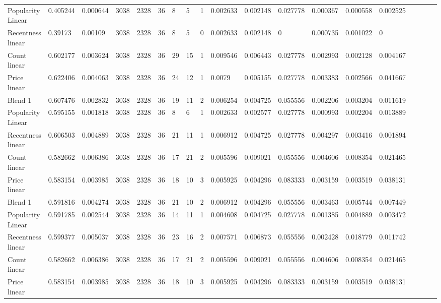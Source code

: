 \begin{table}[H]
{\begin{tabular}{*{19}l}
Popularity Linear	&	0.405244 &	0.000644 &	3038 &	2328 &	36 &	8  &	5 &		1 &	0.002633 &	0.002148 &	0.027778 &	0.000367 &	0.000558 &	0.002525 &	 \\
Recentness linear	&	0.39173  &	0.00109 &	3038 &	2328 &	36 &	8  &	5 &		0 &	0.002633 &	0.002148 &	0 		 &	0.000735 &	0.001022 &	0 &	 \\
Count linear		&	0.602177 &	0.003624 &	3038 &	2328 &	36 &	29 &	15 &	1 &	0.009546 &	0.006443 &	0.027778 &	0.002993 &	0.002128 &	0.004167 &	 \\
Price linear		&	0.622406 &	0.004063 &	3038 &	2328 &	36 &	24 &	12 &	1 &	0.0079   &	0.005155 &	0.027778 &	0.003383 &	0.002566 &	0.041667 &	 \\
Blend 1				&	0.607476 &	0.002832 &	3038 &	2328 &	36 &	19 &	11 &	2 &	0.006254 &	0.004725 &	0.055556 &	0.002206 &	0.003204 &	0.011619 &	 \\
Popularity Linear	&	0.595155 &	0.001818 &	3038 &	2328 &	36 &	8  &	6  &	1 &	0.002633 &	0.002577 &	0.027778 &	0.000993 &	0.002204 &	0.013889 &	 \\
Recentness linear	&	0.606503 &	0.004889 &	3038 &	2328 &	36 &	21 &	11 &	1 &	0.006912 &	0.004725 &	0.027778 &	0.004297 &	0.003416 &	0.001894 &	 \\
Count linear		&	0.582662 &	0.006386 &	3038 &	2328 &	36 &	17 &	21 &	2 &	0.005596 &	0.009021 &	0.055556 &	0.004606 &	0.008354 &	0.021465 &	 \\
Price linear		&	0.583154 &	0.003985 &	3038 &	2328 &	36 &	18 &	10 &	3 &	0.005925 &	0.004296 &	0.083333 &	0.003159 &	0.003519 &	0.038131 &	 \\
Blend 1				&	0.591816 &	0.004274 &	3038 &	2328 &	36 &	21 &	10 &	2 &	0.006912 &	0.004296 &	0.055556 &	0.003463 &	0.005744 &	0.007449 &	 \\
Popularity Linear	&	0.591785 &	0.002544 &	3038 &	2328 &	36 &	14 &	11 &	1 &	0.004608 &	0.004725 &	0.027778 &	0.001385 &	0.004889 &	0.003472 &	 \\
Recentness linear	&	0.599377 &	0.005037 &	3038 &	2328 &	36 &	23 &	16 &	2 &	0.007571 &	0.006873 &	0.055556 &	0.002428 &	0.018779 &	0.011742 &	 \\
Count linear		&	0.582662 &	0.006386 &	3038 &	2328 &	36 &	17 &	21 &	2 &	0.005596 &	0.009021 &	0.055556 &	0.004606 &	0.008354 &	0.021465 &	 \\
Price linear		&	0.583154 &	0.003985 &	3038 &	2328 &	36 &	18 &	10 &	3 &	0.005925 &	0.004296 &	0.083333 &	0.003159 &	0.003519 &	0.038131 &	 \\

\end{tabular}}
\end{table}

